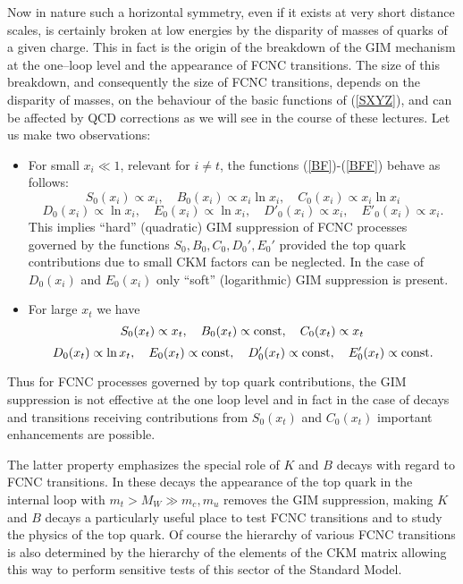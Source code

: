 \documentclass[12pt,rotate]{article}
\begin{document}
\begin{itemize}
\noindent
Now in nature such a horizontal symmetry, even if it exists
at very short distance scales, is certainly broken at low energies by
the disparity of masses of quarks of a given charge. This in fact is
the origin of the breakdown of the GIM mechanism at the one--loop
level and the appearance of FCNC transitions. 
The size of this breakdown, and consequently the size of 
FCNC transitions, depends on the disparity of masses,
on the behaviour of the basic functions of (\ref{SXYZ}), and can be
affected by QCD corrections as we will see in the course of these
lectures. Let us make two
observations: 
\begin{itemize}
\item
For small $x_i\ll 1$, relevant for $i\not= t$, 
the functions (\ref{BF})-(\ref{BFF})
behave as follows:
\begin{equation}
S_0(x_i)\propto x_i, \quad 
  B_0(x_i)\propto x_i \ln x_i, \quad
  C_0(x_i)\propto x_i \ln x_i 
\end{equation}
\begin{equation}
D_0(x_i)\propto \ln x_i, \quad
  E_0(x_i)\propto \ln x_i,  \quad
  D'_0(x_i)\propto x_i, \quad 
  E'_0(x_i)\propto x_i. 
\end{equation}
This implies ``hard'' (quadratic) GIM suppression of FCNC processes 
governed by the
functions $S_0,B_0,C_0,D_0',E_0'$ provided the top quark contributions due 
to small CKM
factors can be neglected. In the case of $D_0(x_i)$ and 
$E_0(x_i)$ only ``soft''
(logarithmic) GIM suppression is present.
\par
\item
For large $x_t$ we have
\begin{equation}
S_0(x_t)\propto x_t, \quad 
  B_0(x_t)\propto {\rm const}, \quad
  C_0(x_t)\propto x_t
\end{equation}
\begin{equation}
D_0(x_t)\propto \ln x_t, \quad
  E_0(x_t)\propto {\rm const},  \quad
  D'_0(x_t)\propto {\rm const}, \quad 
  E'_0(x_t)\propto {\rm const}. 
\end{equation}
\end{itemize}
Thus for FCNC processes governed by top quark contributions, 
the GIM suppression is
not effective at the one loop level and in fact in the case of decays and
transitions receiving contributions from $S_0(x_t)$ and $C_0(x_t)$  
important
enhancements are possible. 
\par

The latter property emphasizes the special role of $K$ and $B$ decays with
regard to FCNC transitions. In these decays the appearance of the
top quark in the internal loop with $m_t>M_W\gg m_c,m_u$ removes the
GIM suppression, making $K$ and $B$ decays a particularly
useful place to test FCNC transitions and to study the physics of
the top quark. Of course the hierarchy of various FCNC transitions is also
determined by the hierarchy of the elements of the CKM matrix allowing
this way to perform sensitive tests of this sector of the Standard
Model. 


\end{itemize}
\end{document}
